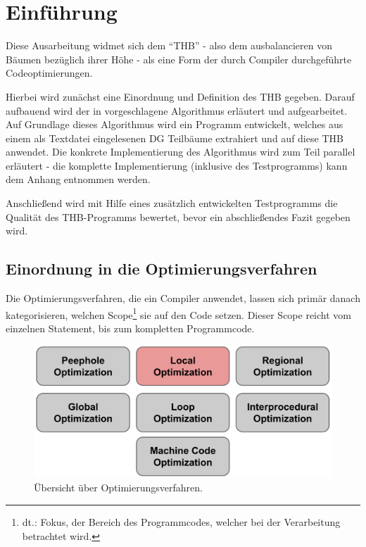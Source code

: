 \chapter{Einführung}
\label{Einfuehrung}
Diese Ausarbeitung widmet sich dem \enquote{\ac{THB}} - also dem ausbalancieren von Bäumen bezüglich ihrer Höhe - als eine Form der durch Compiler durchgeführte Codeoptimierungen.

Hierbei wird zunächst eine Einordnung und Definition des \ac{THB} gegeben. Darauf aufbauend wird der in \cite{HeBIS-309344573} vorgeschlagene Algorithmus erläutert und aufgearbeitet. Auf Grundlage dieses Algorithmus wird ein Programm entwickelt, welches aus einem als Textdatei eingelesenen \ac{DG} Teilbäume extrahiert und auf diese \ac{THB} anwendet. Die konkrete Implementierung des Algorithmus wird zum Teil parallel erläutert - die komplette Implementierung (inklusive des Testprogramms) kann dem Anhang entnommen werden.

Anschließend wird mit Hilfe eines zusätzlich entwickelten Testprogramms die Qualität des \ac{THB}-Programms bewertet, bevor ein abschließendes Fazit gegeben wird.

\section{Einordnung in die Optimierungsverfahren}

Die Optimierungsverfahren, die ein Compiler anwendet, lassen sich primär danach kategorisieren, welchen Scope\footnote{dt.: Fokus, der Bereich des Programmcodes, welcher bei der Verarbeitung betrachtet wird.} sie auf den Code setzen. Dieser Scope reicht vom einzelnen Statement, bis zum kompletten Programmcode.

\begin{figure}[h]
	\centering
	\includegraphics[scale=0.5]{images/Einordnung.png}
	\caption{Übersicht über Optimierungsverfahren.}
	\label{fig:Einordnung}
\end{figure}

